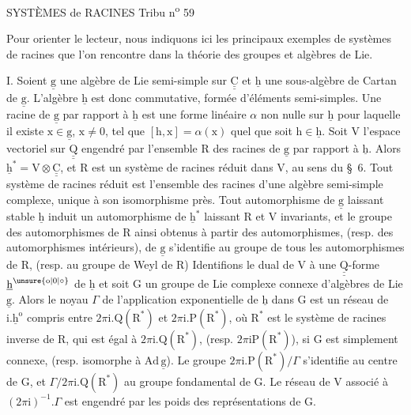 SYSTÈMES de RACINES \hfill Tribu n\textsuperscript{o} 59

Pour orienter le lecteur, nous indiquons ici les principaux exemples de systèmes de racines que l'on rencontre dans la théorie des groupes \unsure{$\cdot$}et algèbres de Lie.

I. Soient $\underline{\mathrm g}$ une algèbre de Lie semi-simple sur $\underline{\underline{\mathrm C}}$ et $\underline{\mathrm h}$ une sous-algèbre de Cartan de $\underline{\mathrm g}$. L'algèbre $\underline{\mathrm h}$ est donc commutative, formée d'éléments semi-simples. Une racine de $\underline{\mathrm g}$ par rapport à $\underline{\mathrm h}$ est une forme linéaire $\alpha$ non nulle sur $\underline{\mathrm h}$ pour laquelle il existe $\mathrm x\in\underline{\mathrm g}$, $\mathrm x\ne0$, tel que $[\mathrm h,\mathrm x]=\alpha(\mathrm x)$ quel que soit $\mathrm h\in\underline{\mathrm h}$. Soit $\mathrm V$ l'espace vectoriel sur $\underline{\underline{\mathrm Q}}$ engendré par l'ensemble $\mathrm R$ des racines de $\underline{\mathrm g}$ par rapport à $\underline{\mathrm h}$. Alors $\underline{\mathrm h}^{*}=\mathrm V\otimes\underline{\underline{\mathrm C}}$, et $\mathrm R$ est un système de racines réduit dans $\mathrm V$, au sens du \S~6. Tout système de racines réduit est l'ensemble des racines d'une algèbre semi-simple complexe, unique à son isomorphisme près. Tout automorphisme de $\underline{\mathrm g}$ laissant stable $\underline{\mathrm h}$ induit un automorphisme de $\underline{\mathrm h}^{*}$ laissant $\mathrm R$ et $\mathrm V$ invariants, et le groupe des automorphismes de $\mathrm R$ ainsi obtenus à partir des automorphismes, (resp. des automorphismes intérieurs), de $\underline{\mathrm g}$ s'identifie au groupe de tous les automorphismes de $\mathrm R$, (resp. au groupe de Weyl de $\mathrm R$) Identifions le dual de $\mathrm V$ à une $\underline{\underline{\mathrm Q}}$-forme $\underline{\mathrm h}^{\unsure{\mathrm o|0|\circ}}$ de $\underline{\mathrm h}$ et soit $\mathrm G$ un groupe de Lie complexe connexe d'algèbres de Lie $\underline{\mathrm g}$. Alors le noyau $\Gamma$ de l'application exponentielle de $\underline{\mathrm h}$ dans $\mathrm G$ est un réseau de $\mathrm i.\underline{\mathrm h}^{\mathrm o}$ compris entre $2\pi\mathrm i.\mathrm Q(\mathrm R^{*})$ et $2\pi\mathrm i.\mathrm P(\mathrm R^{*})$, où $\mathrm R^{*}$ est le système de racines inverse de $\mathrm R$, qui est égal à $2\pi\mathrm i.\mathrm Q(\mathrm R^{*})$, (resp. $2\pi\mathrm i\mathrm P(\mathrm R^{*})$), si $\mathrm G$ est simplement connexe, (resp. isomorphe à $\mathrm{Ad}\,\underline{\mathrm g}$). Le groupe $2\pi\mathrm i.\mathrm P(\mathrm R^{*})/\Gamma$ s'identifie au centre de $\mathrm G$, et $\Gamma/2\pi\mathrm i.\mathrm Q(\mathrm R^{*})$ au groupe fondamental de $\mathrm G$. Le réseau de $\mathrm V$ associé à $(2\pi\mathrm i)^{-1}.\Gamma$ est engendré par les poids des représentations de $\mathrm G$.

